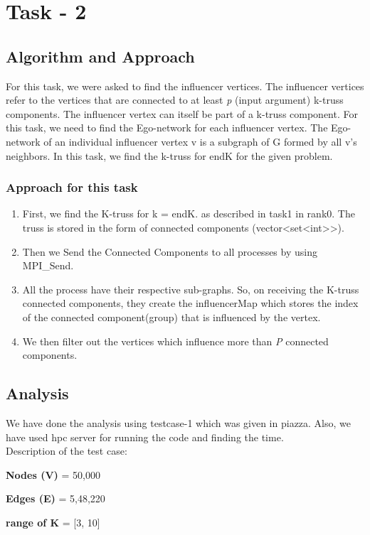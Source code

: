 \documentclass[12pt,a4paper]{article}
\begin{document}
\newpage
\section{Task - 2}
\subsection{Algorithm and Approach}
For this task, we were asked to find the influencer vertices. The influencer vertices refer to the vertices that are connected to at least \emph{p} (input argument) k-truss components. The influencer vertex can itself be part of a k-truss component. For this task, we need to find the Ego-network for each influencer vertex. The Ego-network of an individual influencer vertex v is a subgraph of G
formed by all v’s neighbors. In this task, we find the k-truss for endK for the given problem.

\subsubsection{Approach for this task}
    \begin{enumerate}
        \item First, we find the K-truss for k = endK. as described in task1 in rank0. The truss is stored in the form of connected components (vector<set<int>>).
        \item Then we Send the Connected Components to all processes by using MPI\_Send.
        \item All the process have their respective sub-graphs. So, on receiving the K-truss connected components, they create the influencerMap which stores the index of the connected component(group) that is influenced by the vertex. 
        \item We then filter out the vertices which influence more than \emph{P} connected components.
    \end{enumerate}

\vspace{-3mm}
\subsection{Analysis}
\vspace{-4mm}
We have done the analysis using testcase-1 which was given in piazza. Also, we have used hpc server for running the code and finding the time.\\
Description of the test case: 
\vspace{-4mm}
\item \textbf{Nodes (V)} = 50,000
\vspace{-3mm}
\item \textbf{Edges (E)} = 5,48,220
\vspace{-3mm}
\item \textbf{range of K} = [3, 10]
\vspace{-8mm}
\end{document}
